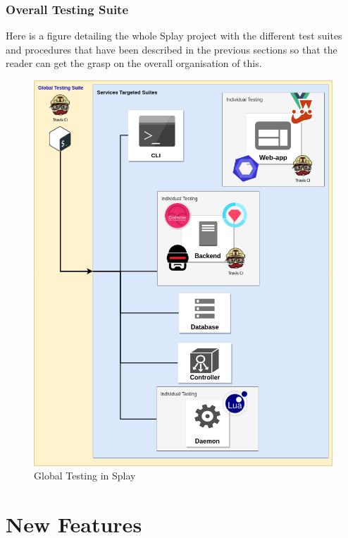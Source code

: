 \documentclass{eplmastersthesis}
\begin{document}
      \subsection{Overall Testing Suite}

        Here is a figure detailing the whole Splay project with the different
        test suites and procedures that have been described in the previous
        sections so that the reader can get the grasp on the overall
        organisation of this.

        \begin{figure}[H]
          \centering
          \includegraphics[scale=0.55]{figures/global_testing.png}
          \caption{\label{global_testing} Global Testing in Splay}
        \end{figure}

    \chapter{New Features}
\end{document}
